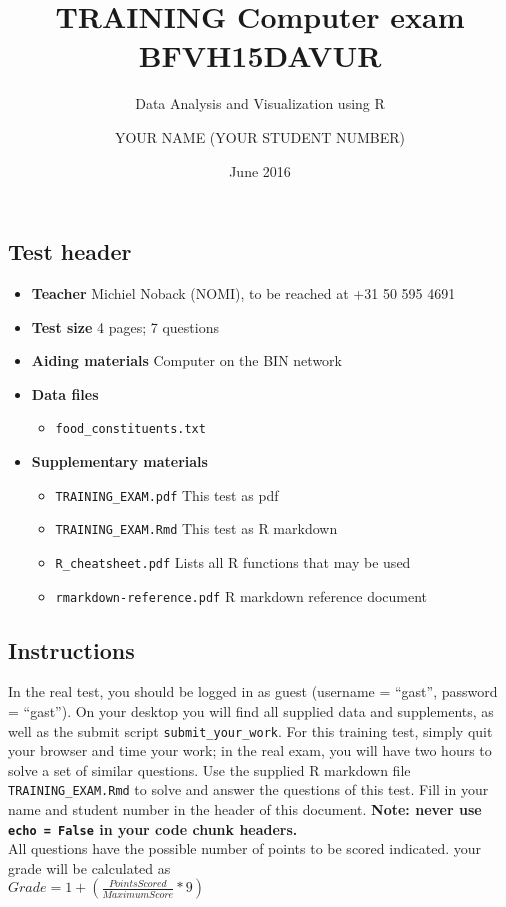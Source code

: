 \documentclass[
  a4paper]{article}
\title{TRAINING Computer exam BFVH15DAVUR}
\subtitle{Data Analysis and Visualization using R}
\author{YOUR NAME (YOUR STUDENT NUMBER)}
\date{June 2016}
\providecommand{\tightlist}{%
  \setlength{\itemsep}{0pt}\setlength{\parskip}{0pt}}
\begin{document}
\maketitle

\hypertarget{test-header}{%
\subsection{Test header}\label{test-header}}

\begin{itemize}
\tightlist
\item
  \textbf{Teacher} Michiel Noback (NOMI), to be reached at +31 50 595
  4691
\item
  \textbf{Test size} 4 pages; 7 questions
\item
  \textbf{Aiding materials} Computer on the BIN network
\item
  \textbf{Data files}

  \begin{itemize}
  \tightlist
  \item
    \texttt{food\_constituents.txt}
  \end{itemize}
\item
  \textbf{Supplementary materials}

  \begin{itemize}
  \tightlist
  \item
    \texttt{TRAINING\_EXAM.pdf} This test as pdf
  \item
    \texttt{TRAINING\_EXAM.Rmd} This test as R markdown
  \item
    \texttt{R\_cheatsheet.pdf} Lists all R functions that may be used
  \item
    \texttt{rmarkdown-reference.pdf} R markdown reference document
  \end{itemize}
\end{itemize}

\hypertarget{instructions}{%
\subsection{Instructions}\label{instructions}}

In the real test, you should be logged in as guest (username = ``gast'',
password = ``gast''). On your desktop you will find all supplied data
and supplements, as well as the submit script
\texttt{submit\_your\_work}. For this training test, simply quit your
browser and time your work; in the real exam, you will have two hours to
solve a set of similar questions. Use the supplied R markdown file
\texttt{TRAINING\_EXAM.Rmd} to solve and answer the questions of this
test. Fill in your name and student number in the header of this
document. \textbf{Note: never use \texttt{echo\ =\ False} in your code
chunk headers.}\\
All questions have the possible number of points to be scored indicated.
your grade will be calculated as\\
\(Grade = 1 + (\frac{PointsScored}{MaximumScore} * 9)\)
\end{document}
